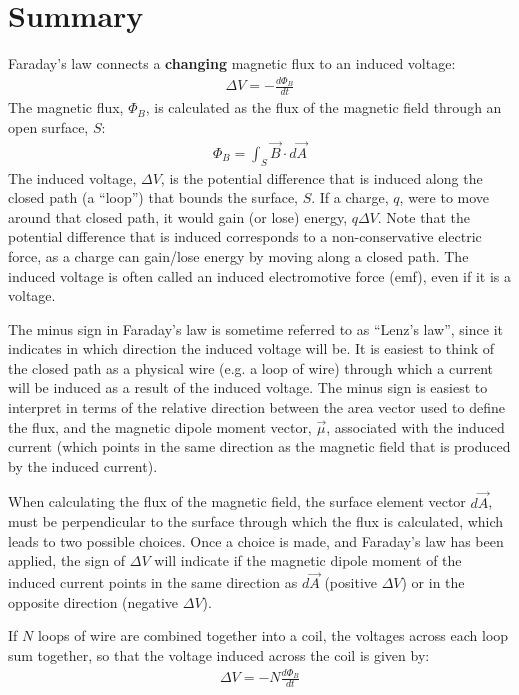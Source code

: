 \newpage
\section{Summary}

\begin{chapterSummary}
Faraday's law connects a \textbf{changing} magnetic flux to an induced voltage:
\begin{align*}
\Delta V = -\frac{d\Phi_B}{dt}
\end{align*}
The magnetic flux, $\Phi_B$, is calculated as the flux of the magnetic field through an open surface, $S$:
\begin{align*}
\Phi_B = \int_S \vec B\cdot d\vec A
\end{align*}
The induced voltage, $\Delta V$, is the potential difference that is induced along the closed path (a ``loop'') that bounds the surface, $S$. If a charge, $q$, were to move around that closed path, it would gain (or lose) energy, $q\Delta V$. Note that the potential difference that is induced corresponds to a non-conservative electric force, as a charge can gain/lose energy by moving along a closed path. The induced voltage is often called an induced electromotive force (emf), even if it is a voltage.

The minus sign in Faraday's law is sometime referred to as ``Lenz's law'', since it indicates in which direction the induced voltage will be. It is easiest to think of the closed path as a physical wire (e.g. a loop of wire) through which a current will be induced as a result of the induced voltage. The minus sign is easiest to interpret in terms of the relative direction between the area vector used to define the flux, and the magnetic dipole moment vector, $\vec \mu$, associated with the induced current (which points in the same direction as the magnetic field that is produced by the induced current). 

When calculating the flux of the magnetic field, the surface element vector $d\vec A$, must be perpendicular to the surface through which the flux is calculated, which leads to two possible choices. Once a choice is made, and Faraday's law has been applied, the sign of $\Delta V$ will indicate if the magnetic dipole moment of the induced current points in the same direction as $d\vec A$ (positive $\Delta V$) or in the opposite direction (negative $\Delta V$).

If $N$ loops of wire are combined together into a coil, the voltages across each loop sum together, so that the voltage induced across the coil is given by:
\begin{align*}
\Delta V = -N\frac{d\Phi_B}{dt}
\end{align*}


\end{chapterSummary}
